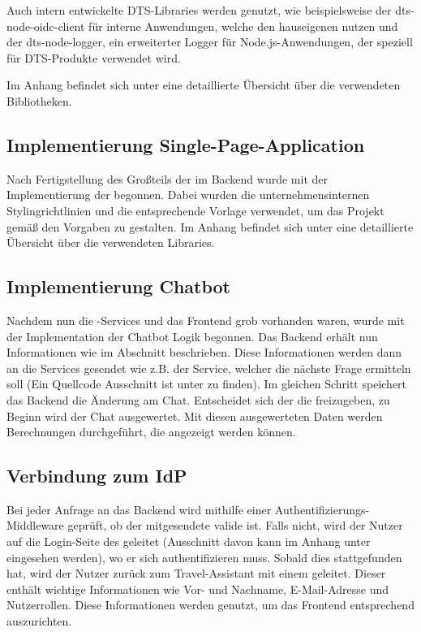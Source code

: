 Auch intern entwickelte DTS-Libraries werden genutzt, wie beispielsweise der dts-node-oidc-client für interne Anwendungen, welche den hauseigenen  nutzen und der dts-node-logger, ein erweiterter Logger für Node.js-Anwendungen, der speziell für DTS-Produkte verwendet wird.

Im Anhang befindet sich unter  eine detaillierte Übersicht über die verwendeten Bibliotheken.

\subsection{Implementierung Single-Page-Application}

Nach Fertigstellung des Großteils der  im Backend wurde mit der Implementierung der  begonnen. Dabei wurden die unternehmensinternen Stylingrichtlinien und die entsprechende Vorlage verwendet, um das Projekt gemäß den Vorgaben zu gestalten. Im Anhang befindet sich unter  eine detaillierte Übersicht über die verwendeten Libraries.

\subsection{Implementierung Chatbot}
Nachdem nun die -Services und das Frontend grob vorhanden waren, wurde mit der Implementation der Chatbot Logik begonnen. Das Backend erhält nun Informationen wie im Abschnitt  beschrieben. Diese Informationen werden dann an die Services gesendet wie z.B. der Service, welcher die nächste Frage ermitteln soll (Ein Quellcode Ausschnitt ist unter  zu finden).  Im gleichen Schritt speichert das Backend die Änderung am Chat. Entscheidet sich der  die  freizugeben, zu Beginn wird der Chat ausgewertet. Mit diesen ausgewerteten Daten werden Berechnungen durchgeführt, die angezeigt werden können.
\subsection{Verbindung zum IdP}

Bei jeder Anfrage an das Backend wird mithilfe einer Authentifizierungs-Middleware geprüft, ob der mitgesendete  valide ist. Falls nicht, wird der Nutzer auf die Login-Seite des  geleitet (Ausschnitt davon kann im Anhang unter  eingesehen werden), wo er sich authentifizieren muss. Sobald dies stattgefunden hat, wird der Nutzer zurück zum Travel-Assistant mit einem  geleitet. Dieser  enthält wichtige Informationen wie Vor- und Nachname, E-Mail-Adresse und Nutzerrollen. Diese Informationen werden genutzt, um das Frontend entsprechend auszurichten.


